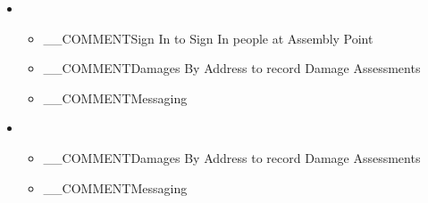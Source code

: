 \begin{itemize}
\item {}
\begin{itemize}
\item __COMMENT{Sign In} to Sign In people at Assembly Point
\item __COMMENT{Damages By Address} to record Damage Assessments
\item __COMMENT{Messaging}
\end{itemize}
\item {}
\begin{itemize}
\item __COMMENT{Damages By Address} to record Damage Assessments
\item __COMMENT{Messaging}
\end{itemize}
\end{itemize}

